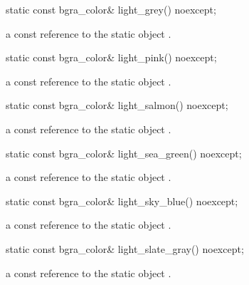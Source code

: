 \begin{itemdecl}
static const bgra_color& light_grey() noexcept;
\end{itemdecl}
\begin{itemdescr}
\pnum
\returns
a const reference to the static  object .
\end{itemdescr}

\begin{itemdecl}
static const bgra_color& light_pink() noexcept;
\end{itemdecl}
\begin{itemdescr}
\pnum
\returns
a const reference to the static  object .
\end{itemdescr}

\begin{itemdecl}
static const bgra_color& light_salmon() noexcept;
\end{itemdecl}
\begin{itemdescr}
\pnum
\returns
a const reference to the static  object .
\end{itemdescr}

\begin{itemdecl}
static const bgra_color& light_sea_green() noexcept;
\end{itemdecl}
\begin{itemdescr}
\pnum
\returns
a const reference to the static  object .
\end{itemdescr}

\begin{itemdecl}
static const bgra_color& light_sky_blue() noexcept;
\end{itemdecl}
\begin{itemdescr}
\pnum
\returns
a const reference to the static  object .
\end{itemdescr}

\begin{itemdecl}
static const bgra_color& light_slate_gray() noexcept;
\end{itemdecl}
\begin{itemdescr}
\pnum
\returns
a const reference to the static  object .
\end{itemdescr}

